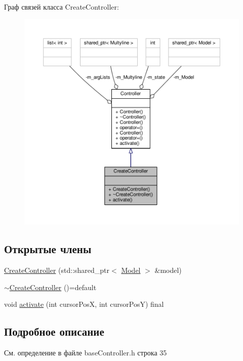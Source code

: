 Граф связей класса Create\-Controller\-:
\nopagebreak
\begin{figure}[H]
\begin{center}
\leavevmode
\includegraphics[width=350pt]{class_create_controller__coll__graph}
\end{center}
\end{figure}
\subsection*{Открытые члены}
\begin{DoxyCompactItemize}
\item 
\hyperlink{class_create_controller_a5d544e80e4786ae8767b61b8fa303f5f}{Create\-Controller} (std\-::shared\-\_\-ptr$<$ \hyperlink{class_model}{Model} $>$ \&model)
\item 
\hyperlink{class_create_controller_af894a8921fb37dec129fc22f9bc6a86a}{$\sim$\-Create\-Controller} ()=default
\item 
void \hyperlink{class_create_controller_abc72a0a1947c1dd5eec2cdfd84f481c5}{activate} (int cursor\-Pos\-X, int cursor\-Pos\-Y) final
\end{DoxyCompactItemize}


\subsection{Подробное описание}


См. определение в файле base\-Controller.\-h строка 35




